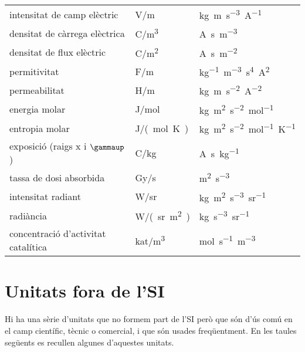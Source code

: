 \begin{longtable}[h]{lll}
   intensitat de camp elèctric & \si{V/m}& \si{kg.m.s^{-3}.A^{-1}}  \\
   densitat de càrrega elèctrica & \si{C/m^3} & \si{A.s.m^{-3}} \\
   densitat de flux elèctric & \si{C/m^2} & \si{A.s.m^{-2}}\\
   permitivitat &  \si{F/m}& \si{kg^{-1}.m^{-3}.s^4.A^2} \\
   permeabilitat &  \si{H/m} & \si{kg.m.s^{-2}.A^{-2}} \\
   energia molar & \si{J/mol} & \si{kg.m^2.s^{-2}.mol^{-1}} \\
   entropia molar& \si{J/(mol.K)} & \si{kg.m^2.s^{-2}.mol^{-1}.K^{-1}} \\
   exposició (raigs x i $\gammaup$) & \si{C/kg} & \si{A.s.kg^{-1}} \\
   tassa de dosi absorbida & \si{Gy/s} & \si{m^2.s^{-3}}\\
   intensitat radiant & \si{W/sr} & \si{kg.m^2.s^{-3}.sr^{-1}} \\
   radiància & \si{W/(sr.m^2)} & \si{kg.s^{-3}.sr^{-1}} \\
   concentració d'activitat catalítica &  \si{kat/m^3} & \si{mol.s^{-1}.m^{-3}}\\
    \bottomrule[1pt]
\end{longtable}



\section{Unitats fora de l'SI}\label{sec:unitats-fora-SI}

Hi ha una sèrie d'unitats que no formem part de l'SI però que són d'ús comú en el camp científic, tècnic o comercial, i que són usades freqüentment. En les taules següents es recullen algunes d'aquestes unitats.

